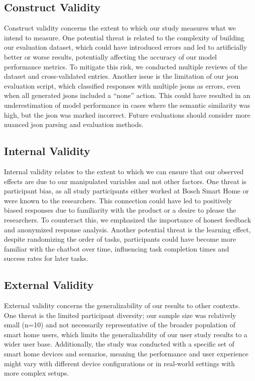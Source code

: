 \subsection{Construct Validity}

Construct validity concerns the extent to which our study measures what we intend to measure. One potential threat is related to the complexity of building our evaluation dataset, which could have introduced errors and led to artificially better or worse results, potentially affecting the accuracy of our model performance metrics. To mitigate this risk, we conducted multiple reviews of the dataset and cross-validated entries. Another issue is the limitation of our \gls{json} evaluation script, which classified responses with multiple \glspl{json} as errors, even when all generated \glspl{json} included a ``none'' action. This could have resulted in an underestimation of model performance in cases where the semantic similarity was high, but the \gls{json} was marked incorrect. Future evaluations should consider more nuanced \gls{json} parsing and evaluation methods.

\subsection{Internal Validity}

Internal validity relates to the extent to which we can ensure that our observed effects are due to our manipulated variables and not other factors. One threat is participant bias, as all study participants either worked at Bosch Smart Home or were known to the researchers. This connection could have led to positively biased responses due to familiarity with the product or a desire to please the researchers. To counteract this, we emphasized the importance of honest feedback and anonymized response analysis. Another potential threat is the learning effect, despite randomizing the order of tasks, participants could have become more familiar with the chatbot over time, influencing task completion times and success rates for later tasks.

\subsection{External Validity}

External validity concerns the generalizability of our results to other contexts. One threat is the limited participant diversity; our sample size was relatively small (n=10) and not necessarily representative of the broader population of smart home users, which limits the generalizability of our user study results to a wider user base. Additionally, the study was conducted with a specific set of smart home devices and scenarios, meaning the performance and user experience might vary with different device configurations or in real-world settings with more complex setups.

